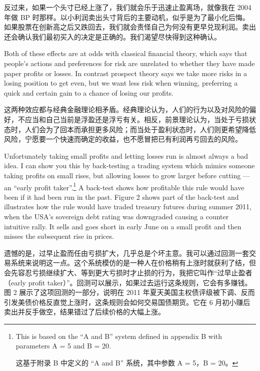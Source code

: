 \begin{chineseblock}反过来，如果一个头寸已经上涨了，我们就会乐于迅速止盈离场，就像我在 2004 年做 BP 时那样。以小利润卖出头寸背后的主要动机，似乎是为了最小化后悔。如果股票在创新高之后又跌回去，我们就会责怪自己为何没有更早兑现利润。卖出还会确认我们最初买入的决定是正确的。我们渴望尽快得到这种确认。\end{chineseblock}

\bipairgap

\begin{englishblock} Both of these effects are at odds with classical financial theory, which says that people's actions and preferences for risk are unrelated to whether they have made paper profits or losses. In contrast prospect theory says we take more risks in a losing position to get even, but we want less risk when winning, preferring a quick and certain gain to a chance of losing our profits. \end{englishblock}

\begin{chineseblock}这两种效应都与经典金融理论相矛盾。经典理论认为，人们的行为以及对风险的偏好，不应当和自己当前是浮盈还是浮亏有关。相反，前景理论认为，当处于亏损状态时，人们会为了回本而承担更多风险；而当处于盈利状态时，人们则更希望降低风险，宁愿要一个快速而确定的收益，也不愿冒把已有利润再亏回去的风险。\end{chineseblock}

\bipairgap

\begin{englishblock} Unfortunately taking small profits and letting losses run is almost always a bad idea. I can show you this by back-testing a trading system which mimics someone taking profits on small rises, but allowing losses to grow larger before cutting --- an ``early profit taker''.\footnote{This is based on the ``A and B'' system defined in appendix B with parameters A = 5 and B = 20. \par 这基于附录 B 中定义的 “A and B” 系统，其中参数 A = 5，B = 20。} A back-test shows how profitable this rule would have been if it had been run in the past. Figure 2 shows part of the back-test and illustrates how the rule would have traded treasury futures during summer 2011, when the USA's sovereign debt rating was downgraded causing a counter intuitive rally. It sells and goes short in early June on a small profit and then misses the subsequent rise in prices. \end{englishblock}

\begin{chineseblock}遗憾的是，过早止盈而任由亏损扩大，几乎总是个坏主意。我可以通过回测一套交易系统来说明这一点。这个系统模仿的是一种人在价格稍有上涨时就获利了结，但会先容忍亏损继续扩大、等到更大亏损时才止损的行为，我把它叫作“过早止盈者（early profit taker）”。回测可以展示，如果过去运行这条规则，它会有多赚钱。图 2 展示了这项回测的一部分，说明在 2011 年夏天美国主权债评级被下调、反而引发美债价格反直觉上涨时，这条规则会如何交易国债期货。它在 6 月初小赚后卖出并反手做空，结果错过了后续价格的大幅上涨。\end{chineseblock}

